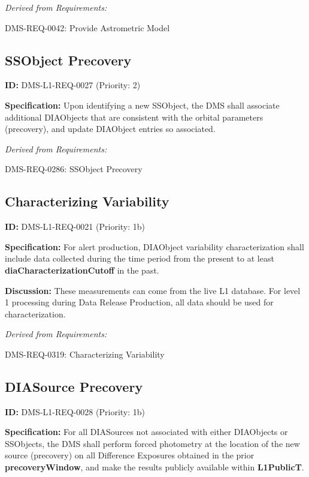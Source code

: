 \documentclass[SE,toc,lsstdraft]{lsstdoc}
\begin{document}
\emph{Derived from Requirements:}

DMS-REQ-0042:
Provide Astrometric Model \newline

\subsection{SSObject Precovery}

\label{DMS-L1-REQ-0027}
\textbf{ID:} DMS-L1-REQ-0027 (Priority: 2)

\textbf{Specification:} Upon identifying a new SSObject, the DMS shall associate additional DIAObjects that are consistent with the orbital parameters (precovery), and update DIAObject entries so associated.

\emph{Derived from Requirements:}

DMS-REQ-0286:
SSObject Precovery \newline

\subsection{Characterizing Variability}

\label{DMS-L1-REQ-0021}
\textbf{ID:} DMS-L1-REQ-0021 (Priority: 1b)

\textbf{Specification:} For alert production, DIAObject variability characterization shall include data collected during the time period from the present to at least \textbf{diaCharacterizationCutoff} in the past.

\textbf{Discussion:} These measurements can come from the live L1 database. For level 1 processing during Data Release Production, all data should be used for characterization.

\emph{Derived from Requirements:}

DMS-REQ-0319:
Characterizing Variability \newline

\subsection{DIASource Precovery}

\label{DMS-L1-REQ-0028}
\textbf{ID:} DMS-L1-REQ-0028 (Priority: 1b)

\textbf{Specification:} For all DIASources not associated with either DIAObjects or SSObjects, the DMS shall perform forced photometry at the location of the new source (precovery) on all Difference Exposures obtained in the prior \textbf{precoveryWindow}, and make the results publicly available within \textbf{L1PublicT}.
\end{document}
